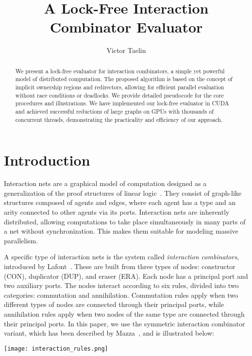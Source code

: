 \documentclass{article}
\title{A Lock-Free Interaction Combinator Evaluator}
\author{Victor Taelin}
\date{}
\begin{document}
\maketitle

\begin{abstract}
We present a lock-free evaluator for interaction combinators, a simple yet powerful model of distributed computation. The proposed algorithm is based on the concept of implicit ownership regions and redirectors, allowing for efficient parallel evaluation without race conditions or deadlocks. We provide detailed pseudocode for the core procedures and illustrations. We have implemented our lock-free evaluator in CUDA and achieved successful reductions of large graphs on GPUs with thousands of concurrent threads, demonstrating the practicality and efficiency of our approach.
\end{abstract}

\section{Introduction}\label{s:introduction}

Interaction nets are a graphical model of computation designed as a generalization of the proof structures of linear logic~\cite{girard1987linear}. They consist of graph-like structures composed of agents and edges, where each agent has a type and an arity connected to other agents via its ports. Interaction nets are inherently distributed, allowing computations to take place simultaneously in many parts of a net without synchronization. This makes them suitable for modeling massive parallelism.

A specific type of interaction nets is the system called \textit{interaction combinators}, introduced by Lafont~\cite{lafont1997interaction}. These are built from three types of nodes: constructor (CON), duplicator (DUP), and eraser (ERA). Each node has a principal port and two auxiliary ports. The nodes interact according to six rules, divided into two categories: commutation and annihilation. Commutation rules apply when two different types of nodes are connected through their principal ports, while annihilation rules apply when two nodes of the same type are connected through their principal ports. In this paper, we use the symmetric interaction combinator variant, which has been described by Mazza~\cite{mazza2007denotational}, and is illustrated below:

\texttt{[image: interaction\_rules.png]}
\end{document}
